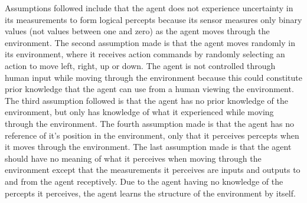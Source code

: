 %




Assumptions followed include that the agent does not experience uncertainty in its measurements to form logical percepts because its sensor measures only binary values (not values between one and zero) as the agent moves through the environment. 
The second assumption made is that the agent moves randomly in its environment, where it receives action commands by randomly selecting an action to move left, right, up or down. The agent is not controlled through human input while moving through the environment because this could constitute prior knowledge that the agent can use from a human viewing the environment. 
The third assumption followed is that the agent has no prior knowledge of the environment, but only has knowledge of what it experienced while moving through the environment. The fourth assumption made is that the agent has no reference of it's position in the environment, only that it perceives percepts when it moves through the environment. The last assumption made is that the agent should have no meaning of what it perceives when moving through the environment except that the measurements it perceives are inputs and outputs to and from the agent receptively. Due to the agent having no knowledge of the percepts it perceives, the agent learns the structure of the environment by itself. 



